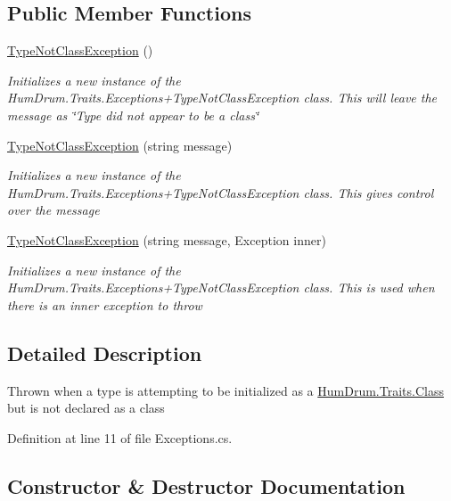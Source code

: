 \subsection*{Public Member Functions}
\begin{DoxyCompactItemize}
\item 
\hyperlink{classHumDrum_1_1Traits_1_1Exceptions_1_1TypeNotClassException_a43c3422bfbc73281e5568449f0174cc6}{Type\+Not\+Class\+Exception} ()
\begin{DoxyCompactList}\small\item\em Initializes a new instance of the Hum\+Drum.\+Traits.\+Exceptions+\+Type\+Not\+Class\+Exception class. This will leave the message as \char`\"{}\+Type did not appear to be a class\char`\"{} \end{DoxyCompactList}\item 
\hyperlink{classHumDrum_1_1Traits_1_1Exceptions_1_1TypeNotClassException_a9277bcc94c9f0cf781e613b3aeaa0d23}{Type\+Not\+Class\+Exception} (string message)
\begin{DoxyCompactList}\small\item\em Initializes a new instance of the Hum\+Drum.\+Traits.\+Exceptions+\+Type\+Not\+Class\+Exception class. This gives control over the message \end{DoxyCompactList}\item 
\hyperlink{classHumDrum_1_1Traits_1_1Exceptions_1_1TypeNotClassException_a02ec8aa58b7b3e5f8b30868e047cc62b}{Type\+Not\+Class\+Exception} (string message, Exception inner)
\begin{DoxyCompactList}\small\item\em Initializes a new instance of the Hum\+Drum.\+Traits.\+Exceptions+\+Type\+Not\+Class\+Exception class. This is used when there is an inner exception to throw \end{DoxyCompactList}\end{DoxyCompactItemize}


\subsection{Detailed Description}
Thrown when a type is attempting to be initialized as a \hyperlink{classHumDrum_1_1Traits_1_1Class}{Hum\+Drum.\+Traits.\+Class} but is not declared as a class 



Definition at line 11 of file Exceptions.\+cs.



\subsection{Constructor \& Destructor Documentation}

